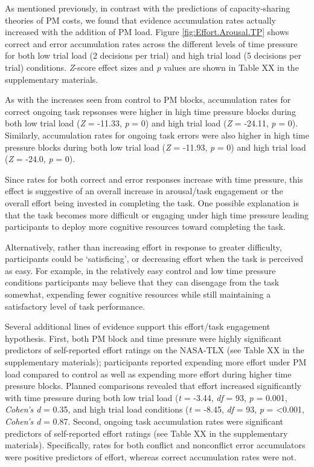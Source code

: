 \documentclass[11pt,]{article}
\begin{document}
As mentioned previously, in contrast with the predictions of
capacity-sharing theories of PM costs, we found that evidence
accumulation rates actually increased with the addition of PM load.
Figure \ref{fig:Effort.Arousal.TP} shows correct and error accumulation
rates across the different levels of time pressure for both low trial
load (2 decisions per trial) and high trial load (5 decisions per trial)
conditions. \emph{Z}-score effect sizes and \emph{p} values are shown in
Table XX in the supplementary materials.

As with the increases seen from control to PM blocks, accumulation rates
for correct ongoing task repsonses were higher in high time pressure
blocks during both low trial load (\emph{Z} = -11.33, \emph{p} = 0) and
high trial load (\emph{Z} = -24.11, \emph{p} = 0). Similarly,
accumulation rates for ongoing task errors were also higher in high time
pressure blocks during both low trial load (\emph{Z} = -11.93, \emph{p}
= 0) and high trial load (\emph{Z} = -24.0, \emph{p} = 0).

Since rates for both correct and error responses increase with time
pressure, this effect is suggestive of an overall increase in
arousal/task engagement or the overall effort being invested in
completing the task. One possible explanation is that the task becomes
more difficult or engaging under high time pressure leading participants
to deploy more cognitive resources toward completing the task.

Alternatively, rather than increasing effort in response to greater
difficulty, participants could be `satisficing', or decreasing effort
when the task is perceived as easy. For example, in the relatively easy
control and low time pressure conditions participants may believe that
they can disengage from the task somewhat, expending fewer cognitive
resources while still maintaining a satisfactory level of task
performance.

Several additional lines of evidence support this effort/task engagement
hypothesis. First, both PM block and time pressure were highly
significant predictors of self-reported effort ratings on the NASA-TLX
(see Table XX in the supplementary materials); participants reported
expending more effort under PM load compared to control as well as
expending more effort during higher time pressure blocks. Planned
comparisons revealed that effort increased significantly with time
pressure during both low trial load (\emph{t} = -3.44, \emph{df} = 93,
\emph{p} = 0.001, \emph{Cohen's d} = 0.35, and high trial load
conditions (\emph{t} = -8.45, \emph{df} = 93, \emph{p} =
\textless{}0.001, \emph{Cohen's d} = 0.87. Second, ongoing task
accumulation rates were significant predictors of self-reported effort
ratings (see Table XX in the supplementary materials). Specifically,
rates for both conflict and nonconflict error accumulators were positive
predictors of effort, whereas correct accumulation rates were not.
\end{document}
